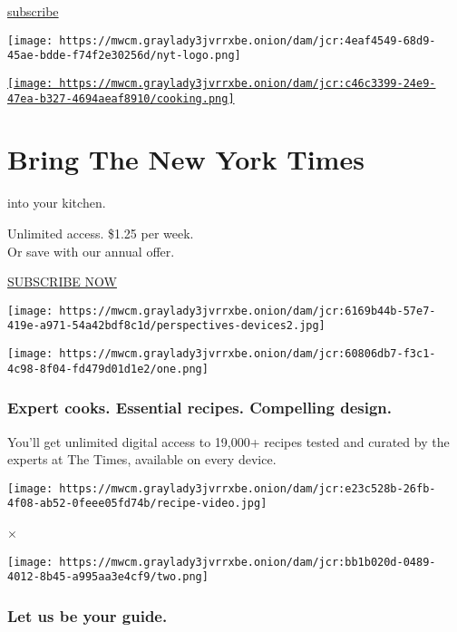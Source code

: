 \href{javascript:void(0)}{subscribe}

\texttt{[image: https://mwcm.graylady3jvrrxbe.onion/dam/jcr:4eaf4549-68d9-45ae-bdde-f74f2e30256d/nyt-logo.png]}

\href{https://cooking.nytimes3xbfgragh.onion/}{\texttt{[image: https://mwcm.graylady3jvrrxbe.onion/dam/jcr:c46c3399-24e9-47ea-b327-4694aeaf8910/cooking.png]}}

\hypertarget{bring-the-new-york-times}{%
\section{Bring The New York Times}\label{bring-the-new-york-times}}

into your kitchen.

Unlimited access. \$1.25 per week.\\
Or save with our annual offer.

\href{javascript:void(0)}{SUBSCRIBE NOW}

\href{javascript:void(0)}{}

\texttt{[image: https://mwcm.graylady3jvrrxbe.onion/dam/jcr:6169b44b-57e7-419e-a971-54a42bdf8c1d/perspectives-devices2.jpg]}

\texttt{[image: https://mwcm.graylady3jvrrxbe.onion/dam/jcr:60806db7-f3c1-4c98-8f04-fd479d01d1e2/one.png]}

\hypertarget{expert-cooks-essential-recipes-compelling-design}{%
\subsubsection{Expert cooks. Essential recipes. Compelling
design.}\label{expert-cooks-essential-recipes-compelling-design}}

You'll get unlimited digital access to 19,000+ recipes tested and
curated by the experts at The Times, available on every device.

\texttt{[image: https://mwcm.graylady3jvrrxbe.onion/dam/jcr:e23c528b-26fb-4f08-ab52-0feee05fd74b/recipe-video.jpg]}

×

\texttt{[image: https://mwcm.graylady3jvrrxbe.onion/dam/jcr:bb1b020d-0489-4012-8b45-a995aa3e4cf9/two.png]}

\hypertarget{let-us-be-your-guide}{%
\subsubsection{Let us be your guide.}\label{let-us-be-your-guide}}

